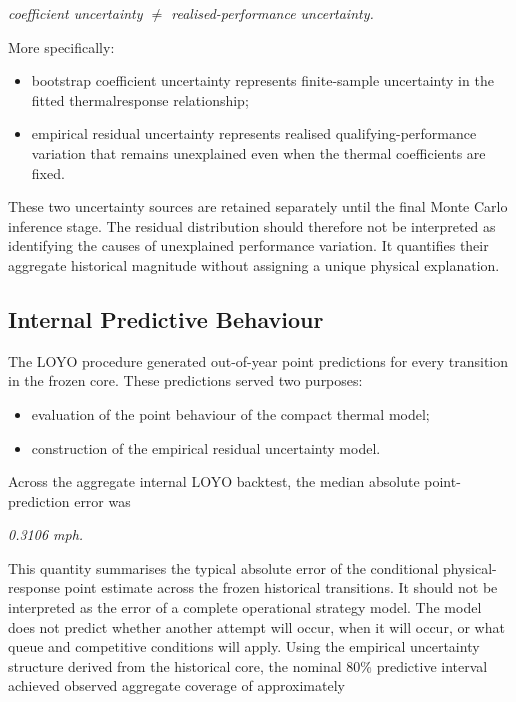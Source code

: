 \begin{center}\textit{coefficient uncertainty \ensuremath{\neq} realised-performance uncertainty.}\end{center}

More specifically:

\begin{itemize}
\item bootstrap coefficient uncertainty represents finite-sample uncertainty in the fitted thermalresponse relationship;
\item empirical residual uncertainty represents realised qualifying-performance variation that remains unexplained even when the thermal coefficients are fixed.
\end{itemize}

These two uncertainty sources are retained separately until the final Monte Carlo inference stage. The residual distribution should therefore not be interpreted as identifying the causes of unexplained performance variation. It quantifies their aggregate historical magnitude without assigning a unique physical explanation.

\subsection{Internal Predictive Behaviour}
The LOYO procedure generated out-of-year point predictions for every transition in the frozen core. These predictions served two purposes:

\begin{itemize}
\item evaluation of the point behaviour of the compact thermal model;
\item construction of the empirical residual uncertainty model.
\end{itemize}

Across the aggregate internal LOYO backtest, the median absolute point-prediction error was

\begin{center}\textit{0.3106 mph.}\end{center}

This quantity summarises the typical absolute error of the conditional physical-response point estimate across the frozen historical transitions. It should not be interpreted as the error of a complete operational strategy model. The model does not predict whether another attempt will occur, when it will occur, or what queue and competitive conditions will apply. Using the empirical uncertainty structure derived from the historical core, the nominal 80\% predictive interval achieved observed aggregate coverage of approximately

